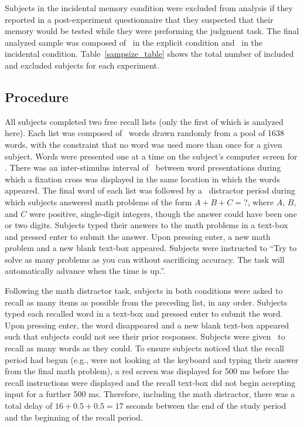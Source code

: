 \documentclass[jou,natbib]{apa6} %
\begin{document}
Subjects in the incidental memory condition were excluded from analysis if they reported in a post-experiment questionnaire that they suspected that their memory would be tested while they were preforming the judgment task. The final analyzed sample was composed of \shoeExplicitIncluded~in the explicit condition and \shoeIncidentalIncluded~in the incidental condition. Table~\ref{sampsize_table} shows the total number of included and excluded subjects for each experiment.
 





\subsection{Procedure}
All subjects completed two free recall lists (only the first of which is analyzed here). Each list was composed of \listlength~words drawn randomly from a pool of 1638 words, with the constraint that no word was used more than once for a given subject. Words were presented one at a time on the subject's computer screen for \presrate. 
There was an inter-stimulus interval of \isi~between word presentations during which a fixation cross was displayed in the same location in which the words appeared. The final word of each list was followed by a \DFRDelay~distractor period during which subjects answered math problems of the form $A+B+C=$?, where $A$, $B$, and $C$ were positive, single-digit integers, though the answer could have been one or two digits. Subjects typed their answers to the math problems in a text-box and pressed enter to submit the answer. Upon pressing enter, a new math problem and a new blank text-box appeared. Subjects were instructed to ``Try to solve as many problems as you can without sacrificing accuracy. The task will automatically advance when the time is up.''.

Following the math distractor task, subjects in both conditions were asked to recall as many items as possible from the preceding list, in any order. Subjects typed each recalled word in a text-box and pressed enter to submit the word. Upon pressing enter, the word disappeared and a new blank text-box appeared such that subjects could not see their prior responses. Subjects were given \recalltime~to recall as many words as they could. To ensure subjects noticed that the recall period had begun (e.g., were not looking at the keyboard and typing their answer from the final math problem), a red screen was displayed for 500 ms before the recall instructions were displayed and the recall text-box did not begin accepting input for a further 500 ms. Therefore, including the math distractor, there was a total delay of $16+0.5+0.5=17$ seconds between the end of the study period and the beginning of the recall period. 
\end{document}
